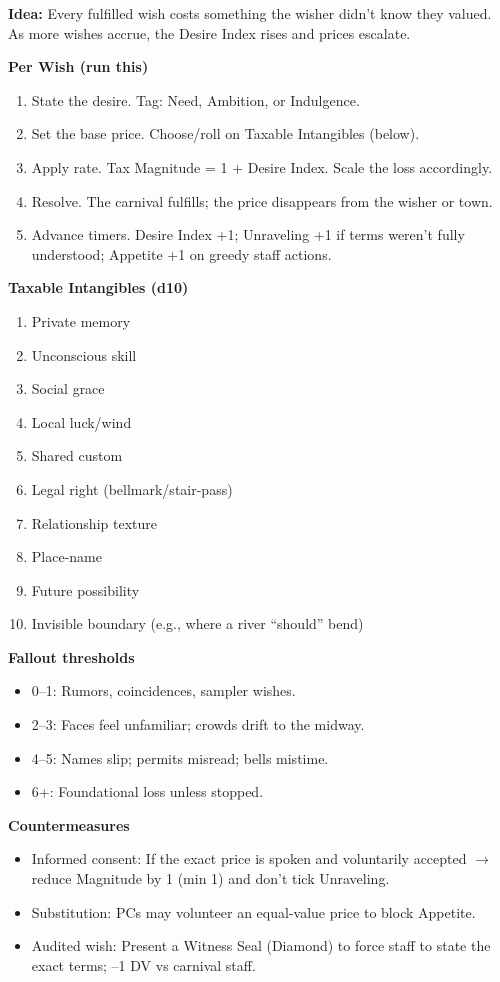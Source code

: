 \documentclass[11pt]{article}
\begin{document}
\textbf{Idea:} Every fulfilled wish costs something the wisher didn't know they valued. As more wishes accrue, the Desire Index rises and prices escalate.

\textbf{Per Wish (run this)}
\begin{enumerate}
\item State the desire. Tag: Need, Ambition, or Indulgence.
\item Set the base price. Choose/roll on Taxable Intangibles (below).
\item Apply rate. Tax Magnitude = 1 + Desire Index. Scale the loss accordingly.
\item Resolve. The carnival fulfills; the price disappears from the wisher or town.
\item Advance timers. Desire Index +1; Unraveling +1 if terms weren't fully understood; Appetite +1 on greedy staff actions.
\end{enumerate}

\textbf{Taxable Intangibles (d10)}
\begin{enumerate}
\item Private memory
\item Unconscious skill
\item Social grace
\item Local luck/wind
\item Shared custom
\item Legal right (bellmark/stair-pass)
\item Relationship texture
\item Place-name
\item Future possibility
\item Invisible boundary (e.g., where a river ``should'' bend)
\end{enumerate}

\textbf{Fallout thresholds}
\begin{itemize}
\item 0--1: Rumors, coincidences, sampler wishes.
\item 2--3: Faces feel unfamiliar; crowds drift to the midway.
\item 4--5: Names slip; permits misread; bells mistime.
\item 6+: Foundational loss unless stopped.
\end{itemize}

\textbf{Countermeasures}
\begin{itemize}
\item Informed consent: If the exact price is spoken and voluntarily accepted $\rightarrow$ reduce Magnitude by 1 (min 1) and don't tick Unraveling.
\item Substitution: PCs may volunteer an equal-value price to block Appetite.
\item Audited wish: Present a Witness Seal (Diamond) to force staff to state the exact terms; --1 DV vs carnival staff.
\end{itemize}
\end{document}
